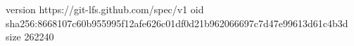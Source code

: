 version https://git-lfs.github.com/spec/v1
oid sha256:8668107c60b955995f12afe626c01df0d21b962066697c7d47e99613d61c4b3d
size 262240

